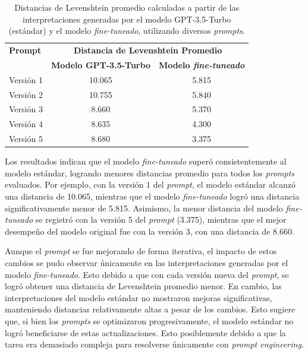 \vspace{0.5cm}
\begin{table}[H]
\centering
\begin{tabular}{|l|c|c|}
\hline
\textbf{Prompt} & \multicolumn{2}{c|}{\textbf{Distancia de Levenshtein Promedio}} \\ 
\cline{2-3}
 & \textbf{Modelo GPT-3.5-Turbo} & \textbf{Modelo \textit{fine-tuneado}} \\ 
\hline
Versión 1 & 10.065 & 5.815 \\
\hline
Versión 2 & 10.755 & 5.840 \\
\hline
Versión 3 & 8.660  & 5.370 \\
\hline
Versión 4 & 8.635  & 4.300 \\
\hline
Versión 5 & 8.680  & 3.375 \\
\hline
\end{tabular}
\caption{Distancias de Levenshtein promedio calculadas a partir de las interpretaciones generadas por el modelo GPT-3.5-Turbo (estándar) y el modelo \textit{fine-tuneado}, utilizando diversos \textit{prompts}.}
\label{tab:levenshtein-comparison}
\end{table}

 Los resultados indican que el modelo \textit{fine-tuneado} superó consistentemente al modelo estándar, logrando menores distancias promedio para todos los \textit{prompts} evaluados. Por ejemplo, con la versión 1 del \textit{prompt}, el modelo estándar alcanzó una distancia de 10.065, mientras que el modelo \textit{fine-tuneado} logró una distancia significativamente menor de 5.815. Asimismo, la menor distancia del modelo \textit{fine-tuneado} se registró con la versión 5 del \textit{prompt} (3.375), mientras que el mejor desempeño del modelo original fue con la versión 3, con una distancia de 8.660. 

Aunque el \textit{prompt} se fue mejorando de forma iterativa, el impacto de estos cambios se pudo observar únicamente en las interpretaciones generadas por el modelo \textit{fine-tuneado}. Esto debido a que con cada versión nueva del \textit{prompt}, se logró obtener una distancia de Levenshtein promedio menor. En cambio, las interpretaciones del modelo estándar no mostraron mejoras significativas, manteniendo distancias relativamente altas a pesar de los cambios. Esto sugiere que, si bien los \textit{prompts} se optimizaron progresivamente, el modelo estándar no logró beneficiarse de estas actualizaciones. Esto posiblemente debido a que la tarea era demasiado compleja para resolverse únicamente con \textit{prompt engineering}.



